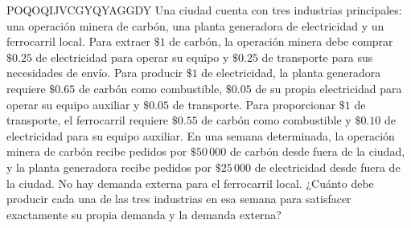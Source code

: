 \begin{examplebox}{}{POQOQIJVCGYQYAGGDY}
    Una ciudad cuenta con tres industrias principales: una operación minera de carbón, una planta generadora de electricidad y un ferrocarril local. Para extraer $\$1$ de carbón, la operación minera debe comprar $\$0.25$ de electricidad para operar su equipo y $\$0.25$ de transporte para sus necesidades de envío. Para producir $\$1$ de electricidad, la planta generadora requiere $\$0.65$ de carbón como combustible, $\$0.05$ de su propia electricidad para operar su equipo auxiliar y $\$0.05$ de transporte. Para proporcionar $\$1$ de transporte, el ferrocarril requiere $\$0.55$ de carbón como combustible y $\$0.10$ de electricidad para su equipo auxiliar. En una semana determinada, la operación minera de carbón recibe pedidos por $\$50 \, 000$ de carbón desde fuera de la ciudad, y la planta generadora recibe pedidos por $\$25 \, 000$ de electricidad desde fuera de la ciudad. No hay demanda externa para el ferrocarril local. ¿Cuánto debe producir cada una de las tres industrias en esa semana para satisfacer exactamente su propia demanda y la demanda externa?


\end{examplebox}
